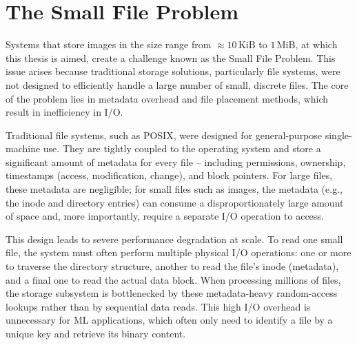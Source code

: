 \section{The Small File Problem} \label{sec:small_files_problem}
Systems that store images in the size range from $\approx 10$\,KiB to $1$\,MiB, at which this thesis is aimed, create a challenge known as the Small File Problem. This issue arises because traditional storage solutions, particularly file systems, were not designed to efficiently handle a large number of small, discrete files. The core of the problem lies in metadata overhead and file placement methods, which result in inefficiency in I/O.

Traditional file systems, such as POSIX, were designed for general-purpose single-machine use. They are tightly coupled to the operating system and store a significant amount of metadata for every file -- including permissions, ownership, timestamps (access, modification, change), and block pointers. For large files, these metadata are negligible; for small files such as images, the metadata (e.g., the inode and directory entries) can consume a disproportionately large amount of space and, more importantly, require a separate I/O operation to access.\cite{beaver_finding_2010}

This design leads to severe performance degradation at scale. To read one small file, the system must often perform multiple physical I/O operations: one or more to traverse the directory structure, another to read the file's inode (metadata), and a final one to read the actual data block. When processing millions of files, the storage subsystem is bottlenecked by these metadata-heavy random-access lookups rather than by sequential data reads. This high I/O overhead is unnecessary for ML applications, which often only need to identify a file by a unique key and retrieve its binary content. \cite{beaver_finding_2010}
